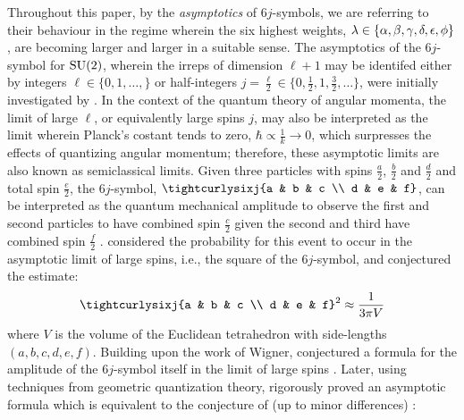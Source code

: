 \documentclass[notitlepage, 10pt]{article}
\begin{document}
Throughout this paper, by the \textit{asymptotics} of $6j$-symbols, we are referring to their behaviour in the regime wherein the six highest weights, $\lambda \in \{\alpha, \beta, \gamma, \delta, \epsilon, \phi\}$, are becoming larger and larger in a suitable sense.
The asymptotics of the $6j$-symbol for $\operatorname{SU}(2)$, wherein the irreps of dimension $\ell + 1$ may be identifed either by integers $\ell \in \{0, 1, \ldots, \}$ or half-integers $j=\frac{\ell}{2}\in\{0, \frac{1}{2}, 1, \frac{3}{2}, \ldots \}$, were initially investigated by \citeauthor{wigner1960group} \cite[Chapter 27]{wigner1960group}.
In the context of the quantum theory of angular momenta, the limit of large $\ell$, or equivalently large spins $j$, may also be interpreted as the limit wherein Planck's costant tends to zero, $\hbar \propto \frac{1}{k} \to 0$, which surpresses the effects of quantizing angular momentum; therefore, these asymptotic limits are also known as semiclassical limits.
Given three particles with spins $\frac{a}{2}$, $\frac{b}{2}$ and $\frac{d}{2}$ and total spin $\frac{e}{2}$, the $6j$-symbol, $\tightcurlysixj{a & b & c \\ d & e & f}$, can be interpreted as the quantum mechanical amplitude to observe the first and second particles to have combined spin $\frac{c}{2}$ given the second and third have combined spin $\frac{f}{2}$ \cite{wigner1960group,roberts1999classical}.
 considered the probability for this event to occur in the asymptotic limit of large spins, i.e., the square of the $6j$-symbol, and conjectured the estimate:
\begin{equation*}
    \tightcurlysixj{a & b & c \\ d & e & f}^2 \approx \frac{1}{3 \pi V}
\end{equation*}
where $V$ is the volume of the Euclidean tetrahedron with side-lengths $(a,b,c,d,e,f)$.
Building upon the work of Wigner, \citeauthor{ponzano1968semiclassical} conjectured a formula for the amplitude of the $6j$-symbol itself in the limit of large spins \cite{ponzano1968semiclassical}.
Later, using techniques from geometric quantization theory, \citeauthor{roberts1999classical} rigorously proved an asymptotic formula which is equivalent to the conjecture of \citeauthor{ponzano1968semiclassical} (up to minor differences) \cite{roberts1999classical}:
\end{document}
